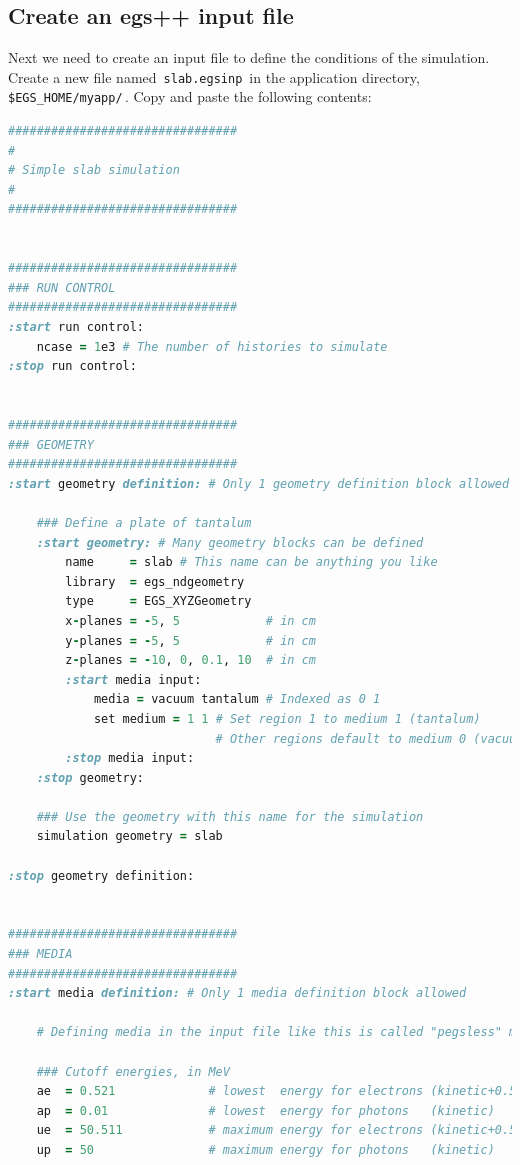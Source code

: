 \documentclass[12pt,twoside]{article}
\begin{document}
\subsection{Create an egs++ input file}

Next we need to create an input file to define the conditions of the simulation.
Create a new file named \,\Verb|slab.egsinp|\, in the application directory,
\,\Verb|$EGS_HOME/myapp/|\,. Copy and paste the following contents:

\begin{lstlisting}[language=ruby,backgroundcolor=\color{white}]
################################
#
# Simple slab simulation
#
################################


################################
### RUN CONTROL
################################
:start run control:
    ncase = 1e3 # The number of histories to simulate
:stop run control:


################################
### GEOMETRY
################################
:start geometry definition: # Only 1 geometry definition block allowed

    ### Define a plate of tantalum
    :start geometry: # Many geometry blocks can be defined
        name     = slab # This name can be anything you like
        library  = egs_ndgeometry
        type     = EGS_XYZGeometry
        x-planes = -5, 5            # in cm
        y-planes = -5, 5            # in cm
        z-planes = -10, 0, 0.1, 10  # in cm
        :start media input:
            media = vacuum tantalum # Indexed as 0 1
            set medium = 1 1 # Set region 1 to medium 1 (tantalum)
                             # Other regions default to medium 0 (vacuum)
        :stop media input:
    :stop geometry:

    ### Use the geometry with this name for the simulation
    simulation geometry = slab

:stop geometry definition:


################################
### MEDIA
################################
:start media definition: # Only 1 media definition block allowed

    # Defining media in the input file like this is called "pegsless" mode

    ### Cutoff energies, in MeV
    ae  = 0.521             # lowest  energy for electrons (kinetic+0.511)
    ap  = 0.01              # lowest  energy for photons   (kinetic)
    ue  = 50.511            # maximum energy for electrons (kinetic+0.511)
    up  = 50                # maximum energy for photons   (kinetic)


\end{lstlisting}
\end{document}
